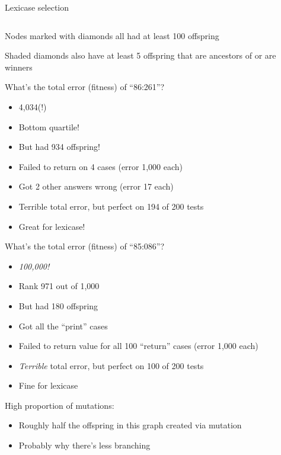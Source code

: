 \documentclass{beamer}
\newcommand{\linespace}{\vskip 0.25cm}
\begin{document}
\begin{frame}{Lexicase selection}
\begin{columns}
\begin{column}{0.45 \linewidth}
\begin{overprint}
			\linespace
			
			Nodes marked with diamonds all had at least 100 offspring
			
			\linespace
			
			Shaded diamonds also have at least 5 offspring that are ancestors of or are winners
			
			What's the total error (fitness) of ``86:261''?
			\begin{itemize}
				\item<4> 4,034(!)
				\item<4> Bottom quartile!
				\item<4> But had 934 offspring! \linespace
				\item<4> Failed to return on 4 cases (error 1,000 each)
				\item<4> Got 2 other answers wrong (error 17 each)
				\item<4> Terrible total error, but perfect on 194 of 200 tests
				\item<4> Great for lexicase!
			\end{itemize}
						
			What's the total error (fitness) of ``85:086''?
			\begin{itemize}
				\item<6> \emph{100,000!}
				\item<6> Rank 971 out of 1,000
				\item<6> But had 180 offspring \linespace
				\item<6> Got all the ``print'' cases
				\item<6> Failed to return value for all 100 ``return'' cases (error 1,000 each)
				\item<6> \emph{Terrible} total error, but perfect on 100 of 200 tests
				\item<6> Fine for lexicase
			\end{itemize}
			
			High proportion of mutations:
			\begin{itemize}
				\item Roughly half the offspring in this graph created via mutation
				\item Probably why there's less branching
			\end{itemize}
			
			\end{overprint}
		\end{column}
	\end{columns}
\end{frame}
\end{document}
